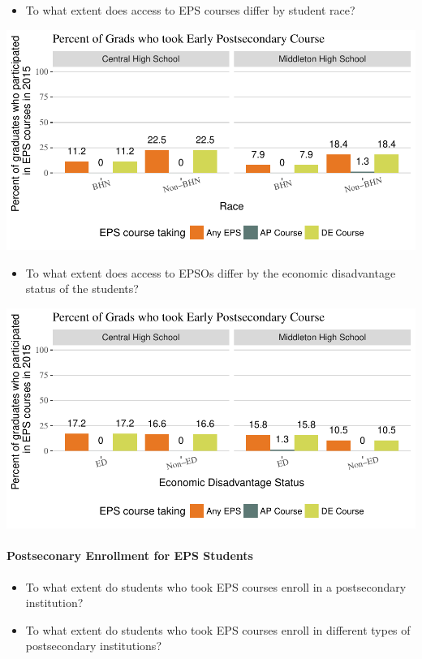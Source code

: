 \documentclass[11pt,]{article}
\providecommand{\tightlist}{%
  \setlength{\itemsep}{0pt}\setlength{\parskip}{0pt}}
\let\oldparagraph\paragraph
\renewcommand{\paragraph}[1]{\oldparagraph{#1}\mbox{}}
\begin{document}
\begin{itemize}
\tightlist
\item
  To what extent does access to EPS courses differ by student race?
\end{itemize}

\includegraphics{20170419_PSWRR_files/figure-latex/Figure9b-1.pdf}

\begin{itemize}
\tightlist
\item
  To what extent does access to EPSOs differ by the economic
  disadvantage status of the students?
\end{itemize}

\includegraphics{20170419_PSWRR_files/figure-latex/Figure9c-1.pdf}

\newpage

\paragraph{Postseconary Enrollment for EPS
Students}\label{postseconary-enrollment-for-eps-students}

\begin{itemize}
\tightlist
\item
  To what extent do students who took EPS courses enroll in a
  postsecondary institution?
\item
  To what extent do students who took EPS courses enroll in different
  types of postsecondary institutions?
\end{itemize}
\end{document}
